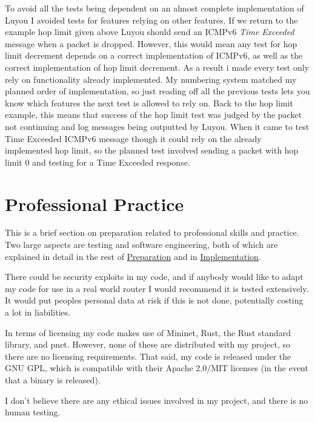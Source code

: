 \documentclass[12pt,a4paper,twoside,openright]{report}
\begin{document}
\bigskip

To avoid all the tests being dependent on an almost complete implementation of Luyou I avoided tests for features relying on other features. If we return to the example hop limit given above Luyou should send an ICMPv6 \textit{Time Exceeded} message when a packet is dropped.  However, this would mean any test for hop limit decrement depends on a correct implementation of ICMPv6, as well as the correct implementation of hop limit decrement.  As a result i made every test only rely on functionality already implemented.  My numbering system matched my planned order of implementation, so just reading off all the previous tests lets you know which features the next test is allowed to rely on.  Back to the hop limit example, this means that success of the hop limit test was judged by the packet not continuing and log messages being outputted by Luyou. When it came to test Time Exceeded ICMPv6 message though it could rely on the already implemented hop limit, so the planned test involved sending a packet with hop limit 0 and testing for a Time Exceeded response.

\section{Professional Practice}
This is a brief section on preparation related to professional skills and practice.  Two large aspects are testing and software engineering, both of which are explained in detail in the rest of \hyperref[chap::preparation]{Preparation} and in \hyperref[chap::implementation]{Implementation}.  

\bigskip

There could be security exploits in my code, and if anybody would like to adapt my code for use in a real world router I would recommend it is tested extensively.  It would put peoples personal data at risk if this is not done, potentially costing a lot in liabilities.

\bigskip

In terms of licensing my code makes use of Mininet, Rust, the Rust standard library, and pnet.  However, none of these are distributed with my project, so there are no licensing requirements.  That said, my code is released under the GNU GPL\cite{gpl}, which is compatible with their Apache 2.0/MIT licenses (in the event that a binary is released).

\bigskip

I don't believe there are any ethical issues involved in my project, and there is no human testing.
\end{document}
